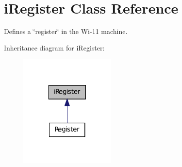 \hypertarget{classiRegister}{
\section{iRegister Class Reference}
\label{classiRegister}
}


Defines a \char`\"{}register\char`\"{} in the Wi-\/11 machine.  




Inheritance diagram for iRegister:
\nopagebreak
\begin{figure}[H]
\begin{center}
\leavevmode
\includegraphics[width=136pt]{classiRegister__inherit__graph}
\end{center}
\end{figure}
